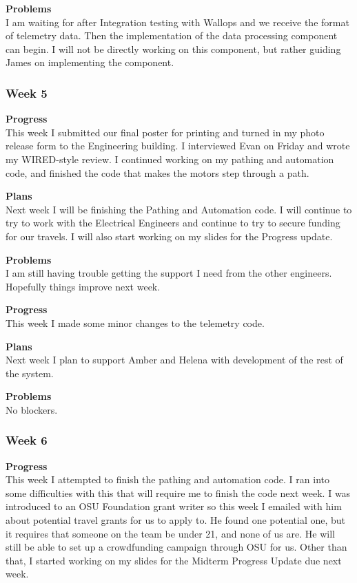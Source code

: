 \textbf{Problems} \\
I am waiting for after Integration testing with Wallops and we receive the format of telemetry data. Then the implementation of the data processing component can begin. I will not be directly working on this component, but rather guiding James on implementing the component.

\subsubsection{Week 5}
\textbf{Progress} \\ 
This week I submitted our final poster for printing and turned in my photo release form to the Engineering building. I interviewed Evan on Friday and wrote my WIRED-style review. I continued working on my pathing and automation code, and finished the code that makes the motors step through a path.

\textbf{Plans} \\ 
Next week I will be finishing the Pathing and Automation code. I will continue to try to work with the Electrical Engineers and continue to try to secure funding for our travels. I will also start working on my slides for the Progress update.

\textbf{Problems} \\ 
I am still having trouble getting the support I need from the other engineers. Hopefully things improve next week.

\textbf{Progress} \\
This week I made some minor changes to the telemetry code.

\textbf{Plans} \\
Next week I plan to support Amber and Helena with development of the rest of the system.

\textbf{Problems} \\
No blockers.

\subsubsection{Week 6}
\textbf{Progress} \\ 
This week I attempted to finish the pathing and automation code. I ran into some difficulties with this that will require me to finish the code next week. I was introduced to an OSU Foundation grant writer so this week I emailed with him about potential travel grants for us to apply to. He found one potential one, but it requires that someone on the team be under 21, and none of us are. He will still be able to set up a crowdfunding campaign through OSU for us. Other than that, I started working on my slides for the Midterm Progress Update due next week.

